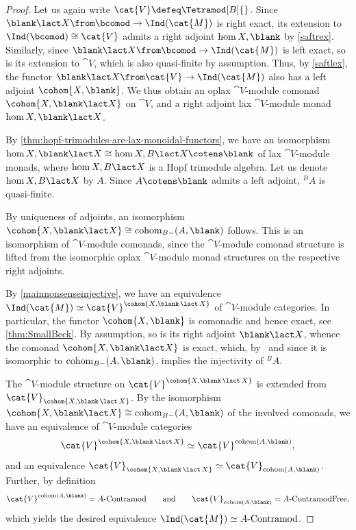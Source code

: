 \begin{proof}
  Let us again write \(\cat{V} \defeq \Tetramod[B]{}\).
  Since \(\blank \lact X\from \bcomod \to \Ind(\cat{M})\) is right exact,
  its extension to \(\Ind(\bcomod) \cong \cat{V}\) admits a right adjoint \(\hom{X,\blank}\) by \cref{saftrex}.
  Similarly, since \(\blank \lact X\from \bcomod \to \Ind(\cat{M})\) is left exact,
  so is its extension to \(\cat{V}\),
  which is also quasi-finite by assumption.
  Thus, by \cref{saftlex},
  the functor \(\blank \lact X\from \cat{V} \to \Ind(\cat{M})\) also has a left adjoint \(\cohom{X, \blank}\).
  We thus obtain an oplax \(\cat{V}\)\hyp{}module comonad \(\cohom{X, \blank \lact X}\) on \(\cat{V}\),
  and a right adjoint lax \(\cat{V}\)\hyp{}module monad \(\hom{X, \blank \lact X}\).

  By \cref{thm:hopf-trimodules-are-lax-monoidal-functors},
  we have an isomorphism \(\hom{X, \blank \lact X} \cong \hom{X, B \lact X} \cotens \blank\) of lax \(\cat{V}\)\hyp{}module monads,
  where \(\hom{X, B \lact X}\) is a Hopf trimodule algebra.
  Let us denote \(\hom{X, B \lact X}\) by \(A\).
  Since \(A \cotens \blank\) admits a left adjoint, \({}^{B}\!A\) is quasi-finite.

  By uniqueness of adjoints, an isomorphism \(\cohom{X, \blank \lact X} \cong \mathrm{cohom}_{B-}(A,\blank)\) follows.
  This is an isomorphism of \(\cat{V}\)\hyp{}module comonads,
  since the \(\cat{V}\)\hyp{}module comonad structure
  is lifted from the isomorphic oplax \(\cat{V}\)\hyp{}module monad structures on the respective right adjoints.

  By \cref{mainnonsenseinjective},
  we have an equivalence \(\Ind(\cat{M}) \simeq \cat{V}^{\cohom{X, \blank \,\lact\, X}}\) of \(\cat{V}\)\hyp{}module categories.
  In particular, the functor \(\cohom{X, \blank}\) is comonadic
  and hence exact, see \cref{thm:SmallBeck}.
  By assumption, so is its right adjoint \(\blank \lact X\),
  whence the comonad \(\cohom{X, \blank \lact X}\) is exact,
  which, by~\cite[1.12]{takeuchi77:morit} and since it is isomorphic to \(\mathrm{cohom}_{B-}(A,\blank)\),
  implies the injectivity of \({}^{B}\!A\).

  The \(\cat{V}\)\hyp{}module structure on \(\cat{V}^{\cohom{X,\blank \,\lact\, X}}\) is extended from \(\cat{V}_{\cohom{X,\blank \,\lact\, X}}\).
  By the isomorphism \(\cohom{X, \blank \lact X} \cong \mathrm{cohom}_{B-}(A,\blank)\) of the involved comonads,
  we have an equivalence of \(\cat{V}\)\hyp{}module categories
  \[
    \cat{V}^{\cohom{X, \blank \,\lact\, X}} \simeq \cat{V}^{\mathrm{cohom}(A,\blank)},
  \]
  and an equivalence \(\cat{V}_{\cohom{X, \blank \,\lact\, X}} \simeq \cat{V}_{\mathrm{cohom}(A,\blank)}\).
  Further, by definition
  \[
    \cat{V}^{\mathrm{cohom}(A,\blank)} = A\textnormal{-Contramod}
    \qquad\text{and}\qquad
    \cat{V}_{\mathrm{cohom}(A,\blank)} = A\textnormal{-ContramodFree},
  \]
  which yields the desired equivalence \(\Ind(\cat{M}) \simeq A\textnormal{-Contramod}\).


\end{proof}
